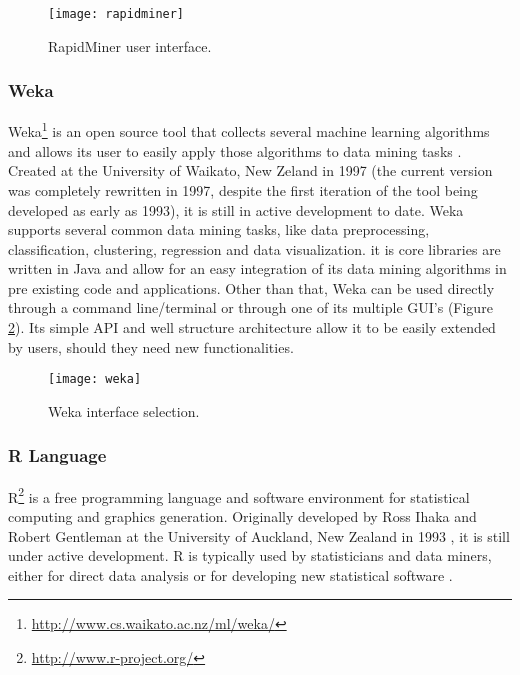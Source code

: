 \begin{figure}[!htb]
  \begin{center}
    \leavevmode
    \texttt{[image: rapidminer]}
    \caption[RapidMiner user interface]{RapidMiner user interface.}
    \label{fig:rapidminer}
  \end{center}
\end{figure}

\subsubsection*{Weka}

Weka\footnote{\url{http://www.cs.waikato.ac.nz/ml/weka/}} is an open source tool that
collects several machine learning algorithms and allows its user to easily apply
those algorithms to data mining tasks \cite{Hall}. Created at the University of
Waikato, New Zeland in 1997 (the current version was completely rewritten in
1997, despite the first iteration of the tool being developed as early as 1993),
it is still in active development to date. Weka supports several common data
mining tasks, like data preprocessing, classification, clustering, regression
and data visualization. it is core libraries are written in Java and allow for an
easy integration of its data mining algorithms in pre existing code and
applications. Other than that, Weka can be used directly through a command
line/terminal or through one of its multiple GUI's (Figure \ref{fig:weka}). Its
simple API and well structure architecture allow it to be easily extended by
users, should they need new functionalities.

\begin{figure}[!htb]
  \begin{center}
    \leavevmode
    \texttt{[image: weka]}
    \caption[Weka interface selection]{Weka interface selection.}
    \label{fig:weka}
  \end{center}
\end{figure}

\subsubsection*{R Language}

R\footnote{\url{http://www.r-project.org/}} is a free programming language and
software environment for statistical computing and graphics generation.
Originally developed by Ross Ihaka and Robert Gentleman at the University of
Auckland, New Zealand in 1993 \cite{Ihaka1998}, it is still under active
development. R is typically used by statisticians and data miners, either for
direct data analysis or for developing new statistical software \cite{Fox2005}.

